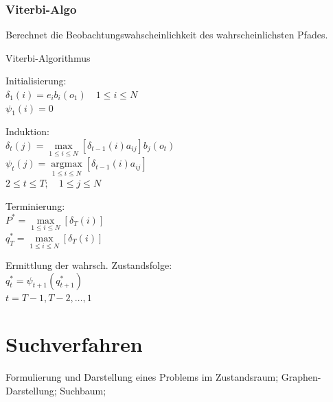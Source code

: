 \documentclass[german,color,6pt]{latex4ei/latex4ei_sheet}
\begin{document}
\begin{sectionbox}
\subsubsection{Viterbi-Algo}
Berechnet die Beobachtungswahscheinlichkeit des wahrscheinlichsten Pfades.
\begin{cookbox}{Viterbi-Algorithmus}
	\item Initialisierung: \\
		$\delta_1 (i) = e_i b_i (o_1) \quad 1 \leq i \leq N $\\
		$\psi _1 (i) = 0$\\
	\item Induktion: \\
		$\delta_t (j) = \max\limits_{1 \leq i \leq N }\left[ \delta_{t-1} (i) a_{ij} \right] b_j (o_t)$\\
		$\psi_t(j) = \underset{1 \leq i \leq N}{\operatorname{argmax}} \left[\delta_{t-1}(i) a_{ij} \right]$\\
		$2 \leq t \leq T; \quad 1 \leq j \leq N$\\
	\item Terminierung: \\
		$P^* = \max\limits_{1 \leq i \leq N} [\delta_T(i)]$\\
		$q_T^* = \max\limits_{1 \leq i \leq N} [\delta_T(i)]$\\
	\item Ermittlung der wahrsch. Zustandsfolge:\\
		$q_t^* = \psi_{t+1}(q^*_{t+1})$\\
		$t= T-1, T-2, \dots , 1$\\
\end{cookbox}
\end{sectionbox}

\columnbreak


\section{Suchverfahren}
\begin{symbolbox}
	Formulierung und Darstellung eines Problems im Zustandsraum; Graphen-Darstellung; Suchbaum;
\end{symbolbox}
\end{document}
